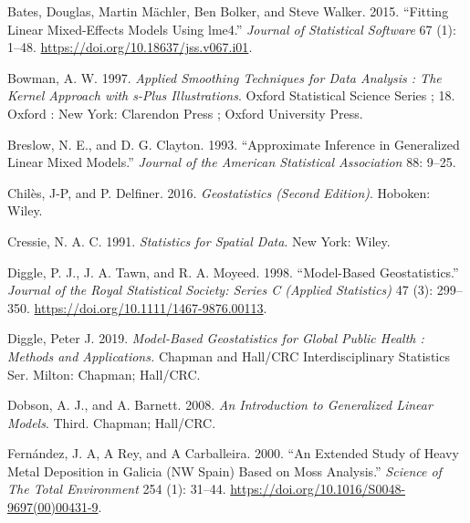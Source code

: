 \documentclass[
  letterpaper,
]{krantz}
\newlength{\cslhangindent}
\newlength{\cslentryspacingunit} %
\newenvironment{CSLReferences}[2] %
 {%
  \setlength{\parindent}{0pt}
  \ifodd #1
  \let\oldpar\par
  \def\par{\hangindent=\cslhangindent\oldpar}
  \fi
  \setlength{\parskip}{#2\cslentryspacingunit}
 }%
 {}
\begin{document}

\hypertarget{refs}{}
\begin{CSLReferences}{1}{0}
\leavevmode{}%
Bates, Douglas, Martin Mächler, Ben Bolker, and Steve Walker. 2015.
{``Fitting Linear Mixed-Effects Models Using {lme4}.''} \emph{Journal of
Statistical Software} 67 (1): 1--48.
\url{https://doi.org/10.18637/jss.v067.i01}.

\leavevmode{}%
Bowman, A. W. 1997. \emph{Applied Smoothing Techniques for Data Analysis
: The Kernel Approach with s-Plus Illustrations}. Oxford Statistical
Science Series ; 18. Oxford : New York: Clarendon Press ; Oxford
University Press.

\leavevmode{}%
Breslow, N. E., and D. G. Clayton. 1993. {``Approximate Inference in
Generalized Linear Mixed Models.''} \emph{Journal of the American
Statistical Association} 88: 9--25.

\leavevmode{}%
Chilès, J-P, and P. Delfiner. 2016. \emph{Geostatistics (Second
Edition)}. Hoboken: Wiley.

\leavevmode{}%
Cressie, N. A. C. 1991. \emph{Statistics for Spatial Data}. New York:
Wiley.

\leavevmode{}%
Diggle, P. J., J. A. Tawn, and R. A. Moyeed. 1998. {``Model-Based
Geostatistics.''} \emph{Journal of the Royal Statistical Society: Series
C (Applied Statistics)} 47 (3): 299--350.
\url{https://doi.org/10.1111/1467-9876.00113}.

\leavevmode{}%
Diggle, Peter J. 2019. \emph{Model-Based Geostatistics for Global Public
Health : Methods and Applications.} Chapman and Hall/CRC
Interdisciplinary Statistics Ser. Milton: Chapman; Hall/CRC.

\leavevmode{}%
Dobson, A. J., and A. Barnett. 2008. \emph{An Introduction to
Generalized Linear Models}. Third. Chapman; Hall/CRC.

\leavevmode{}%
Fernández, J. A, A Rey, and A Carballeira. 2000. {``An Extended Study of
Heavy Metal Deposition in Galicia (NW Spain) Based on Moss Analysis.''}
\emph{Science of The Total Environment} 254 (1): 31--44.
\url{https://doi.org/10.1016/S0048-9697(00)00431-9}.


\end{CSLReferences}
\end{document}
